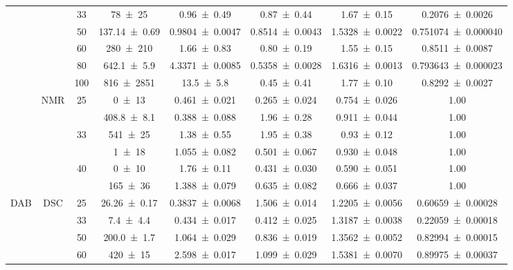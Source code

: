 \begin{table}[!ht]
\begin{tabular}{c|cc ccccc}
        ~ & ~ & 33 & \num{78 \pm 25} & \num{0.96 \pm 0.49} & \num{0.87 \pm 0.44} & \num{1.67 \pm 0.15} & \num{0.2076 \pm 0.0026} \\
        ~ & ~ & 50 & \num{137.14 \pm 0.69} & \num{0.9804 \pm 0.0047} & \num{0.8514 \pm 0.0043} & \num{1.5328 \pm 0.0022} & \num{0.751074 \pm 0.000040} \\
        ~ & ~ & 60 & \num{280 \pm 210} & \num{1.66 \pm 0.83} & \num{0.80 \pm 0.19} & \num{1.55 \pm 0.15} & \num{0.8511 \pm 0.0087} \\
        ~ & ~ & 80 & \num{642.1 \pm 5.9} & \num{4.3371 \pm 0.0085} & \num{0.5358 \pm 0.0028} & \num{1.6316 \pm 0.0013} & \num{0.793643 \pm 0.000023} \\
        ~ & ~ & 100 & \num{816 \pm 2851} & \num{13.5 \pm 5.8} & \num{0.45 \pm 0.41} & \num{1.77 \pm 0.10} & \num{0.8292 \pm 0.0027} \\
        \cline{2-8}
        ~ & \multirow{6}{*}{NMR} & \multirow{2}{*}{25} & \num{0 \pm 13} & \num{0.461 \pm 0.021} & \num{0.265 \pm 0.024} & \num{0.754 \pm 0.026} & 1.00 \\
        ~ & ~ & ~ & \num{408.8 \pm 8.1} & \num{0.388 \pm 0.088} & \num{1.96 \pm 0.28} & \num{0.911 \pm 0.044} & 1.00 \\
        ~ & ~ & \multirow{2}{*}{33} & \num{541 \pm 25} & \num{1.38 \pm 0.55} & \num{1.95 \pm 0.38} & \num{0.93 \pm 0.12} & 1.00 \\
        ~ & ~ & ~ & \num{1 \pm 18} & \num{1.055 \pm 0.082} & \num{0.501 \pm 0.067} & \num{0.930 \pm 0.048} & 1.00 \\
        ~ & ~ & \multirow{2}{*}{40} & \num{0 \pm 10} & \num{1.76 \pm 0.11} & \num{0.431 \pm 0.030} & \num{0.590 \pm 0.051} & 1.00 \\
        ~ & ~ & ~ & \num{165 \pm 36} & \num{1.388 \pm 0.079} & \num{0.635 \pm 0.082} & \num{0.666 \pm 0.037} & 1.00 \\
    \midrule
        \multirow{9}{*}{DAB} & \multirow{6}{*}{DSC} & 25 & \num{26.26 \pm 0.17} & \num{0.3837 \pm 0.0068} & \num{1.506 \pm 0.014} & \num{1.2205 \pm 0.0056} & \num{0.60659 \pm 0.00028} \\
        ~ & ~ & 33 & \num{7.4 \pm 4.4} & \num{0.434 \pm 0.017} & \num{0.412 \pm 0.025} & \num{1.3187 \pm 0.0038} & \num{0.22059 \pm 0.00018} \\
        ~ & ~ & 50 & \num{200.0 \pm 1.7} & \num{1.064 \pm 0.029} & \num{0.836 \pm 0.019} & \num{1.3562 \pm 0.0052} & \num{0.82994 \pm 0.00015} \\
        ~ & ~ & 60 & \num{420 \pm 15} & \num{2.598 \pm 0.017} & \num{1.099 \pm 0.029} & \num{1.5381 \pm 0.0070} & \num{0.89975 \pm 0.00037} \\

\end{tabular}
\end{table}
